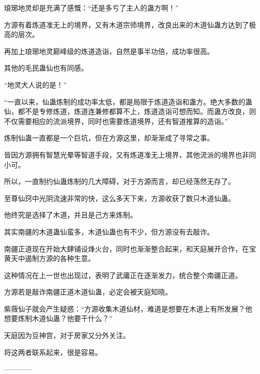 \begin{this_body}
琅琊地灵却是充满了感慨：“还是多亏了主人的蛊方啊！”

方源有着炼道准无上的境界，又有木道宗师境界，改良出来的木道仙蛊方达到了极高的层次。

再加上琅琊地灵巅峰级的炼道造诣，自然是事半功倍，成功率很高。

其他的毛民蛊仙也有同感。

“地灵大人说的是！”

“一直以来，仙蛊炼制的成功率太低，都是局限于炼道造诣和蛊方。绝大多数的蛊仙，都不是专修炼道，炼道连兼修都算不上，炼道造诣可想而知。而蛊方改良，则不仅需要相应的流派境界，同时也需要炼道境界，还有智道推算的造诣。”

炼制仙蛊一直都是一个巨坑，但在方源这里，却渐渐成了寻常之事。

皆因方源拥有智慧光晕等智道手段，又有炼道准无上境界，其他流派的境界也非同小可。

所以，一直制约仙蛊炼制的几大障碍，对于方源而言，却已经荡然无存了。

至尊仙窍中光阴流速非常的快，这么多天下来，方源收获了数只木道仙蛊。

他终究是选择了木道，并且是己方来炼制。

其实南疆的木道蛊仙蛮多，木道仙蛊也有不少，但方源没有去敲诈。

南疆正道现在开始大肆铺设烽火台，同时也渐渐整合起来，和天庭展开合作，在宝黄天中遏制方源的各种生意。

这种情况在上一世也出现过，表明了武庸正在逐渐发力，统合整个南疆正道。

方源若是敲诈南疆正道木道仙蛊，必定会被天庭知晓。

紫薇仙子就会产生疑惑：“方源收集木道仙材，难道是想要在木道上有所发展？他想要炼制木道仙蛊？他要干什么？”

天庭因为豆神宫，对于房家又分外关注。

将这两者联系起来，很是容易。

------------

\end{this_body}

